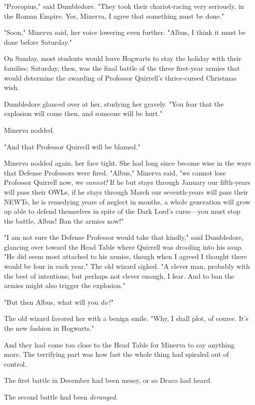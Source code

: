 "Procopius," said Dumbledore. "They took their chariot-racing very seriously,
in the Roman Empire. Yes, Minerva, I agree that something must be done."

"Soon," Minerva said, her voice lowering even further. "Albus, I think it must
be done before Saturday."

On Sunday, most students would leave Hogwarts to stay the holiday with their
families; Saturday, then, was the final battle of the three first-year armies
that would determine the awarding of Professor Quirrell's thrice-cursed
Christmas wish.

Dumbledore glanced over at her, studying her gravely. "You fear that the
explosion will come then, and someone will be hurt."

Minerva nodded.

"And that Professor Quirrell will be blamed."

Minerva nodded again, her face tight. She had long since become wise in the
ways that Defense Professors were fired. "Albus," Minerva said, "we cannot lose
Professor Quirrell now, we \emph{cannot!} If he but stays through January our
fifth-years will pass their OWLs, if he stays through March our seventh-years
will pass their NEWTs, he is remedying years of neglect in months, a whole
generation will grow up able to defend themselves in spite of the Dark Lord's
curse---you must stop the battle, Albus! Ban the armies now!"

"I am not sure the Defense Professor would take that kindly," said Dumbledore,
glancing over toward the Head Table where Quirrell was drooling into his soup.
"He did seem most attached to his armies, though when I agreed I thought there
would be four in each year." The old wizard sighed. "A clever man, probably
with the best of intentions; but perhaps not clever enough, I fear. And to ban
the armies might also trigger the explosion."

"But then Albus, what will you \emph{do?}"

The old wizard favored her with a benign smile. "Why, I shall plot, of course.
It's the new fashion in Hogwarts."

And they had come too close to the Head Table for Minerva to say anything more.
\sbreak
The terrifying part was how fast the whole thing had spiraled out of control.

The first battle in December had been{\el} messy, or so Draco had heard.

The second battle had been \emph{deranged}.


